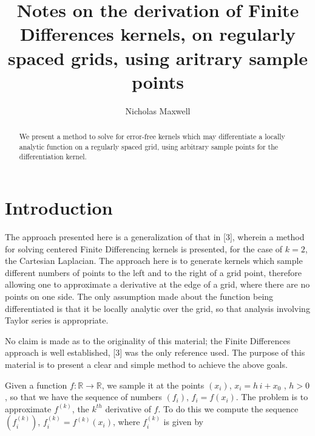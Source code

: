 \documentclass[amsmath,amssymb,floatfix]{revtex4}
\numberwithin{equation}{section}
\begin{document}
\title{Notes on the derivation of Finite Differences kernels, on regularly spaced grids, using aritrary sample points}

\author{Nicholas Maxwell}





\begin{abstract}
We present a method to solve for error-free kernels which may differentiate a locally analytic function on a regularly spaced grid, using arbitrary sample points for the differentiation kernel.
\end{abstract}

\maketitle


\section{\label{sec:level1}Introduction\protect}

The approach presented here is a generalization of that in [3], wherein a method for solving centered Finite Differencing kernels is presented, for the case of $k=2$, the Cartesian Laplacian. The approach here is to generate kernels which sample different numbers of points to the left and to the right of a grid point, therefore allowing one to approximate a derivative at the edge of a grid, where there are no points on one side. The only assumption made about the function being differentiated is that it be locally analytic over the grid, so that analysis involving Taylor series is appropriate.

	No claim is made as to the originality of this material; the Finite Differences approach is well established, [3] was the only reference used. The purpose of this material is to present a clear and simple method to achieve the above goals.
	
	Given a function $f: \mathbb{R} \rightarrow \mathbb{R}$, we sample it at the points $(x_i)$, $x_i = h\, i + x_0$ , $h>0$, so that we have the sequence of numbers $(f_i)$, $f_i = f(x_i)$. The problem is to approximate $f^{(k)}$, the $k^{th}$ derivative of $f$. To do this we compute the sequence $(f^{(k)}_i)$, $f^{(k)}_i = f^{(k)}(x_i)$, where $f^{(k)}_i$ is given by
\end{document}
